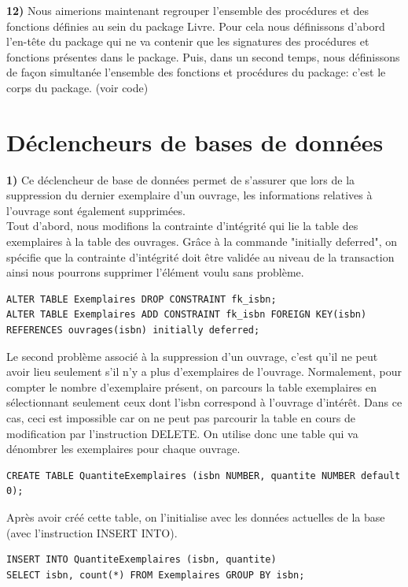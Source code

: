 \documentclass[a4paper,12pt]{article}
\begin{document}
\textbf {12)} Nous aimerions maintenant regrouper l’ensemble des procédures et des fonctions définies au sein du package Livre. Pour cela nous définissons d'abord l'en-tête du package qui ne va contenir que les signatures des procédures et fonctions présentes dans le package. Puis, dans un second temps, nous définissons de façon simultanée l'ensemble des fonctions et procédures du package: c'est le corps du package. (voir code)


         \section{Déclencheurs de bases de données}
\textbf {1)} Ce déclencheur de base de données permet de s'assurer que lors de la suppression du dernier exemplaire d’un ouvrage, les informations relatives à l’ouvrage sont également supprimées. \\
Tout d'abord, nous modifions la contrainte d'intégrité qui lie la table des exemplaires à la table des ouvrages. Grâce à la commande "initially deferred", on spécifie que la contrainte d'intégrité doit être validée au niveau de la transaction ainsi nous pourrons supprimer l'élément voulu sans problème.

\begin{lstlisting}
ALTER TABLE Exemplaires DROP CONSTRAINT fk_isbn;
ALTER TABLE Exemplaires ADD CONSTRAINT fk_isbn FOREIGN KEY(isbn) REFERENCES ouvrages(isbn) initially deferred;
\end{lstlisting}

Le second problème associé à la suppression d'un ouvrage, c'est qu'il ne peut avoir lieu seulement s'il n'y a plus d'exemplaires de l'ouvrage. Normalement, pour compter le nombre d'exemplaire présent, on parcours la table exemplaires en sélectionnant seulement ceux dont l'isbn correspond à l'ouvrage d'intérêt. Dans ce cas, ceci est impossible car on ne peut pas parcourir la table en cours de modification par l'instruction DELETE. On utilise donc une table qui va dénombrer les exemplaires pour chaque ouvrage.

\begin{lstlisting}
CREATE TABLE QuantiteExemplaires (isbn NUMBER, quantite NUMBER default 0);
\end{lstlisting}

Après avoir créé cette table, on l'initialise avec les données actuelles de la base (avec l'instruction INSERT INTO).

\begin{lstlisting}
INSERT INTO QuantiteExemplaires (isbn, quantite)
SELECT isbn, count(*) FROM Exemplaires GROUP BY isbn;
\end{lstlisting}
\end{document}

